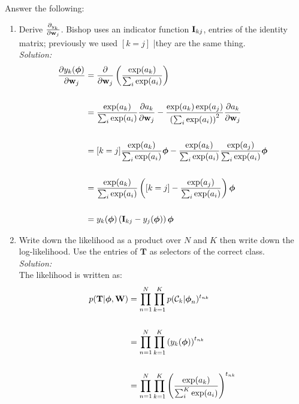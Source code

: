 \documentclass[12pt,a4paper]{article}
\newcommand{\lp}{\left(}
\newcommand{\rp}{\right)}
\newcommand{\eye}{{\bf I}}
\newcommand{\tscalar}{t}
\newcommand{\Tmat}{{\bf \MakeUppercase\tscalar}}
\newcommand{\wscalar}{w}
\newcommand{\wvec}{{\bf \wscalar}}
\newcommand{\Wmat}{{\bf \MakeUppercase\wscalar}}
\newcommand{\phivec}{\boldsymbol{\phi}}
\newcommand{\class}{\mathcal{C}}
\begin{document}
	Answer the following:
	\begin{enumerate}
		\item Derive $\frac{\partial_{y_{k}}}{\partial\wvec_j}$. Bishop uses an indicator function $\eye_{kj}$, entries of the identity matrix; previously we used $[k = j]$ |they are the same thing. \\
		\emph{Solution:} \\
		
		\begin{align*}
			\frac{\partial y_k(\phivec)}{\partial \wvec_j} &= \frac{\partial}{\partial \wvec_j} \lp \frac{\exp(a_k)}{\sum_i \exp(a_i)} \rp \\\\
			&= \frac{\exp(a_k)}{\sum_i \exp(a_i)} \frac{\partial a_k}{\partial \wvec_j} - \frac{\exp(a_k) \exp(a_j)}{\lp \sum_i \exp(a_i) \rp^2}  \frac{\partial a_k}{\partial \wvec_j} \\\\
			&= [k = j] \frac{\exp(a_k)}{\sum_i \exp(a_i)} \phivec - \frac{\exp(a_k)}{\sum_i \exp(a_i)} \frac{\exp(a_j)}{\sum_i \exp(a_i)} \phivec \\\\
			&= \frac{\exp(a_k)}{\sum_i \exp(a_i)} \lp [k = j] - \frac{\exp(a_j)}{\sum_i \exp(a_i)} \rp \phivec \\\\
			&= y_k(\phivec) \lp \eye_{kj} - y_j(\phivec) \rp \phivec
		\end{align*}		  
		
		\item Write down the likelihood as a product over $N$ and $K$ then write down the log-likelihood. Use the entries of $\textbf{T}$ as selectors of the correct class. \\
		\emph{Solution:} \\
		The likelihood is written as:
		\begin{align*}
			p(\Tmat | \phivec, \Wmat) &= \prod_{n=1}^N \prod_{k=1}^K p(\class_k | \phivec_n)^{t_{nk}} \\\\
			&= \prod_{n=1}^N \prod_{k=1}^K \lp y_k(\phivec) \rp^{t_{nk}} \\\\
			&= \prod_{n=1}^N \prod_{k=1}^K \lp \frac{\exp(a_k)}{\sum_i^K \exp(a_i)} \rp^{t_{nk}} 
		\end{align*}
		

\end{enumerate}
\end{document}
